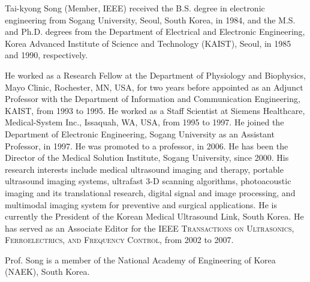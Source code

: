 \begin{IEEEbiography}{Tai-kyong Song} (Member, IEEE) received the B.S. degree in electronic engineering from Sogang University, Seoul, South Korea, in 1984, and the M.S. and Ph.D. degrees from the Department of Electrical and Electronic Engineering, Korea Advanced Institute of Science and Technology (KAIST), Seoul, in 1985 and 1990, respectively. 

  He worked as a Research Fellow at the Department of Physiology and Biophysics, Mayo Clinic, Rochester, MN, USA, for two years before appointed as an Adjunct Professor with the Department of Information and Communication Engineering, KAIST, from 1993 to 1995.
  He worked as a Staff Scientist at Siemens Healthcare, Medical-System Inc., Issaquah, WA, USA, from 1995 to 1997.
  He joined the Department of Electronic Engineering, Sogang University as an Assistant Professor, in 1997.
  He was promoted to a professor, in 2006. He has been the Director of the Medical Solution Institute, Sogang University, since 2000.
  His research interests include medical ultrasound imaging and therapy, portable ultrasound imaging systems, ultrafast 3-D scanning algorithms, photoacoustic imaging and its translational research, digital signal and image processing, and multimodal imaging system for preventive and surgical applications.
  He is currently the President of the Korean Medical Ultrasound Link, South Korea.
  He has served as an Associate Editor for the \textsc{IEEE Transactions on Ultrasonics, Ferroelectrics, and Frequency Control}, from 2002 to 2007.

  Prof. Song is a member of the National Academy of Engineering of Korea (NAEK), South Korea. 
\end{IEEEbiography}

